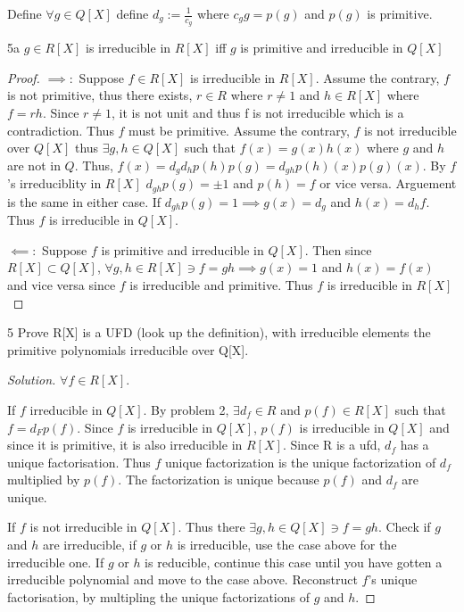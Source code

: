 \documentclass{article}
\newenvironment{solution}
{\renewcommand\qedsymbol{$\blacksquare$}\begin{proof}[Solution]}
{\end{proof}}
\begin{document}
\bigskip

Define $\forall g \in Q[X]$ define $d_g := \frac{1}{c_g}$ where $c_g g = p(g)$ and $p(g)$ is primitive.    



\begin{claim}{5a}\label{Claim 5a.}
    $g \in R[X]$ is irreducible in $R[X]$  iff $g$ is primitive and irreducible in $Q[X]$     
\end{claim}
\begin{proof}

    $\implies:$ Suppose $f \in R[X]$ is irreducible in $R[X]$. Assume the contrary, $f$ is not primitive, thus there exists, $r \in R$ where $r \neq 1$  and $h \in R[X]$ where $f = rh$. Since $r \neq 1$, it is not unit and thus f is not irreducible which is a contradiction. Thus $f$ must be primitive. Assume the contrary, $f$ is not irreducible over $Q[X]$ thus $\exists g, h \in Q[X]$ such that $f(x) = g(x)h(x)$ where $g$ and $h$ are not in $Q$. Thus, $f(x) = d_g d_h p(h) p(g)= d_{gh} p(h)(x) p(g)(x)$. By $f$'s irreduciblity in $R[X]$ $d_{gh} p(g) = \pm 1$ and $p(h) = f$ or vice versa. Arguement is the same in either case. If $d_{gh} p(g) = 1 \implies g(x) = d_g$ and $h(x) = d_h f$. Thus $f$ is irreducible in $Q[X]$.
    
    $\impliedby:$ Suppose $f$ is primitive and irreducible in $Q[X]$. Then since $R[X] \subset Q[X]$, $\forall g, h \in R[X] \ni f = gh \implies g(x) = 1$ and $h(x) = f(x)$ and vice versa since $f$ is irreducible and primitive. Thus $f$ is irreducible in $R[X]$           
\end{proof}
\begin{PROB}{5}\label{Problem 5.}
    Prove R[X] is a UFD (look up the definition), with irreducible elements the primitive polynomials irreducible over Q[X]. 
\end{PROB}
\begin{solution}
    $\forall f \in R[X]$. 
    
    If $f$ irreducible in $Q[X]$. By problem 2, $\exists d_f \in R$ and $p(f) \in R[X]$ such that $f=  d_F p(f)$. Since $f$ is irreducible in $Q[X]$, $p(f)$ is irreducible in $Q[X]$ and since it is primitive, it is also irreducible in $R[X]$. Since R is a ufd, $d_f$ has a unique factorisation. Thus $f$ unique factorization is the unique factorization of $d_f$ multiplied by $p(f)$. The factorization is unique because $p(f)$ and $d_f$ are unique.    
    
    If $f$ is not irreducible in $Q[X]$. Thus there $\exists g, h \in Q[X] \ni f = gh$. Check if $g$ and $h$ are irreducible, if $g$ or $h$ is irreducible, use the case above for the irreducible one. If $g$ or $h$ is reducible, continue this case until you have gotten a irreducible polynomial and move to the case above. Reconstruct $f$'s unique factorisation, by multipling the unique factorizations of $g$ and $h$.              
\end{solution}
\end{document}
